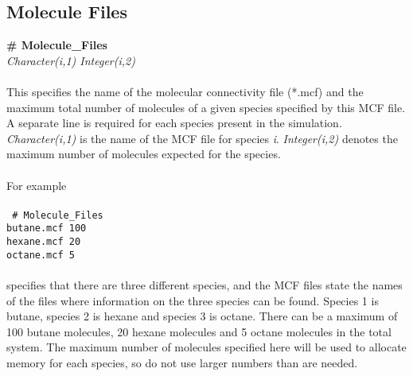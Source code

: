 \subsection{Molecule Files}\label{sec:Molecule_Files}
{\bf \# Molecule\_Files} \\
{\it Character(i,1) Integer(i,2)}  \\ \\
%
This specifies the name of the molecular connectivity file (*.mcf) and
the maximum total number of molecules of a given species specified by this MCF
file. A separate line is required for each species present in the
simulation.  {\it Character(i,1)} is the name of the MCF file for
species {\it i}. {\it Integer(i,2)} denotes the maximum number of
molecules expected for the species.  \\ \\
For example \\ \\
\texttt{
\# Molecule\_Files \\
butane.mcf 100 \\
hexane.mcf 20\\
octane.mcf 5} \\ \\
specifies that there are three different species, and the MCF files
state the names of the files where information on the three species
can be found. Species 1 is butane, species 2 is hexane and species 3
is octane. There can be a maximum of 100 butane molecules, 20 hexane
molecules and 5 octane molecules in the total system. The maximum
number of molecules specified here will be used to allocate memory for
each species, so do not use larger numbers than are needed. 
%
%
